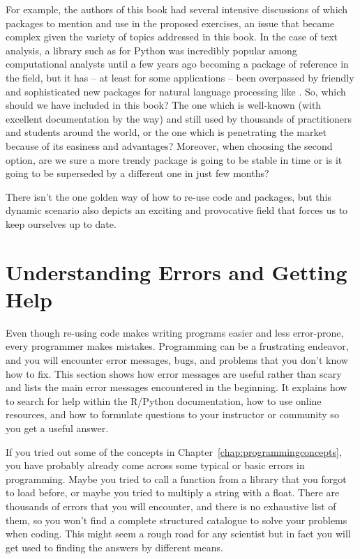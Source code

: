 For example, the authors of this book had several intensive discussions of which packages to mention and use in the proposed exercises, an issue that became complex given the variety of topics addressed in this book. In the case of text analysis, a library such as  for Python was incredibly popular among computational analysts until a few years ago becoming a package of reference in the field, but it has -- at least for some applications -- been overpassed by friendly and sophisticated new packages for natural language processing like . So, which should we have included in this book? The one which is well-known (with excellent documentation by the way) and still used by thousands of practitioners and students around the world, or the one which is penetrating the market because of its easiness and advantages? Moreover, when choosing the second option, are we sure a more trendy package is going to be stable in time or is it going to be superseded by a different one in just few months?

There isn't the one golden way of how to re-use code and packages, but this dynamic scenario also depicts an exciting and provocative field that forces us to keep ourselves up to date.


%

\section{Understanding Errors and Getting Help}
\label{sec:errors}

Even though re-using code makes writing programs easier and less error-prone, every programmer makes mistakes.
Programming can be a frustrating endeavor, and you will encounter error messages, bugs, and problems that you don’t know how to fix. This section shows how error messages are useful rather than scary and lists the main error messages encountered in the beginning. It explains how to search for help within the R/Python documentation, how to use online resources, and how to formulate questions to your instructor or community so you get a useful answer.

If you tried out some of the concepts in Chapter~\ref{chap:programmingconcepts}, you have probably already come across some typical or basic errors in programming. Maybe you tried to call a function from a library that you forgot to load before, or maybe you tried to multiply a string with a float.
There are thousands of errors that you will encounter, and there is no exhaustive list of them, so you won't find a complete structured catalogue to solve your problems when coding. This might seem a rough road for any scientist but in fact you will get used to finding the answers by different means.


